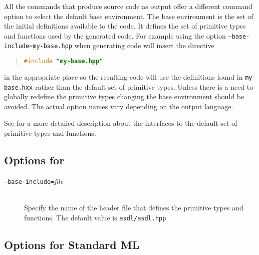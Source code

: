 All the commands that produce source code as output offer a different
command option to select the default base environment.
The base environment is the set of the initial definitions available to the code.
It defines the set of primitive types and functions used by the generated code.
For example using the option \texttt{--base-include=my-base.hpp}
when generating \Cplusplus{} code will insert the directive
\begin{quote}\begin{lstlisting}[language=c++]
#include "my-base.hpp"
\end{lstlisting}\end{quote}%
in the appropriate place so the resulting code will use the definitions found in
\texttt{my-base.hxx} rather than the default set of primitive types.
Unless there is a need to globally redefine
the primitive types changing the base environment should be avoided.
The actual option names vary depending on the output language.

See  for a more detailed description about the interfaces
to the default set of primitive types and functions.

\subsection*{Options for \Cplusplus}

\begin{description}
  \item[\normalfont\texttt{--base-include=}\textit{file}] \mbox{}\\
    Specify the name of the \Cplusplus{} header file that defines the primitive \asdl{} types
    and functions.
    The default value is \texttt{asdl/asdl.hpp}.
\end{description}%

\subsection*{Options for Standard ML}

